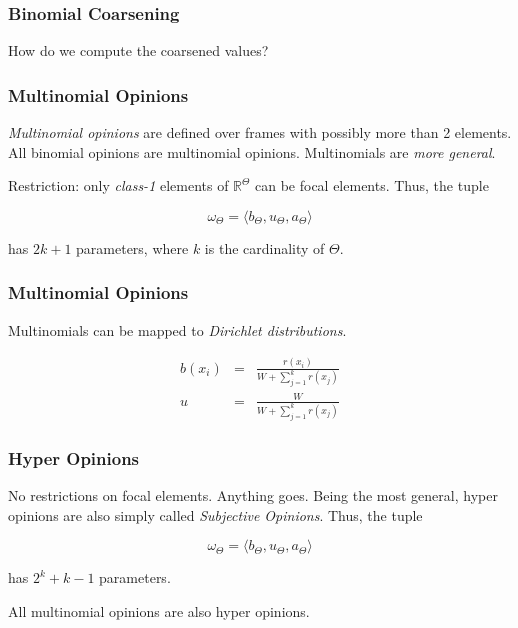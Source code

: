 \documentclass{beamer}
\begin{document}
\begin{frame}
\frametitle{Binomial Coarsening}

How do we compute the coarsened values?

\end{frame}



\begin{frame}
\frametitle{Multinomial Opinions}

\emph{Multinomial opinions} are defined over frames with possibly more than 2 elements.
All binomial opinions are multinomial opinions. Multinomials are \emph{more general}.

Restriction: only \emph{class-1} elements of $\mathbb{R}^\Theta$ can be focal elements.
Thus, the tuple

$$
\omega_\Theta = \langle b_\Theta, u_\Theta, a_\Theta \rangle
$$

has $2k + 1$ parameters, where $k$ is the cardinality of $\Theta$.

\end{frame}


\begin{frame}
\frametitle{Multinomial Opinions}

Multinomials can be mapped to \emph{Dirichlet distributions}.

\begin{eqnarray}
  b(x_i) &=& \frac{r(x_i)}{W + \sum_{j = 1}^k r(x_j)} \\
  u      &=& \frac{W}{W + \sum_{j = 1}^k r(x_j)}
\end{eqnarray}

\end{frame}



\begin{frame}
\frametitle{Hyper Opinions}

No restrictions on focal elements. Anything goes. Being the most general, hyper
opinions are also simply called \emph{Subjective Opinions}. Thus, the tuple

$$
\omega_\Theta = \langle b_\Theta, u_\Theta, a_\Theta \rangle
$$

has $2^{k} + k - 1$ parameters.

All multinomial opinions are also hyper opinions.

\end{frame}
\end{document}
